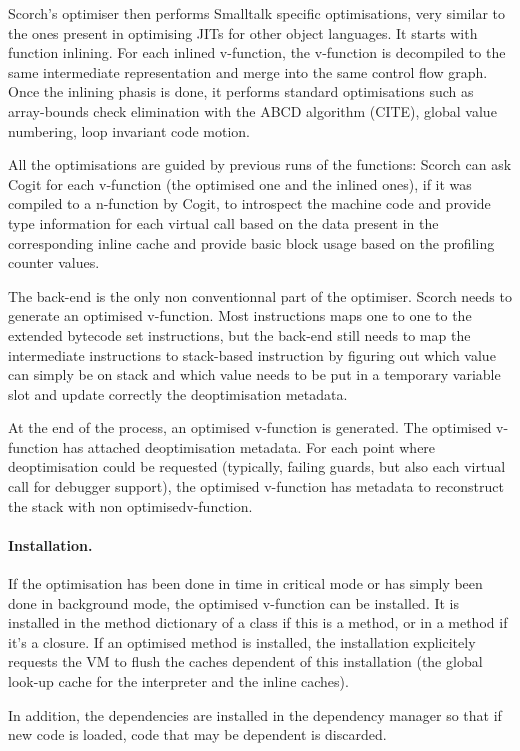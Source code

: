 \documentclass[a4paper,12pt,twoside]{../includes/ThesisStyle}
\begin{document}
Scorch's optimiser then performs Smalltalk specific optimisations, very similar to the ones present in optimising JITs for other object languages. It starts with function inlining. For each inlined v-function, the v-function is decompiled to the same intermediate representation and merge into the same control flow graph. Once the inlining phasis is done, it performs standard optimisations such as array-bounds check elimination with the ABCD algorithm (CITE), global value numbering, loop invariant code motion.

All the optimisations are guided by previous runs of the functions: Scorch can ask Cogit for each v-function (the optimised one and the inlined ones), if it was compiled to a n-function by Cogit, to introspect the machine code and provide type information for each virtual call based on the data present in the corresponding inline cache and provide basic block usage based on the profiling counter values.

The back-end is the only non conventionnal part of the optimiser. Scorch needs to generate an optimised v-function. Most instructions maps one to one to the extended bytecode set instructions, but the back-end still needs to map the intermediate instructions to stack-based instruction by figuring out which value can simply be on stack and which value needs to be put in a temporary variable slot and update correctly the deoptimisation metadata.

At the end of the process, an optimised v-function is generated. The optimised v-function has attached deoptimisation metadata. For each point where deoptimisation could be requested (typically, failing guards, but also each virtual call for debugger support), the optimised v-function has metadata to reconstruct the stack with non optimisedv-function.

\paragraph{Installation.}
If the optimisation has been done in time in critical mode or has simply been done in background mode, the optimised v-function can be installed. It is installed in the method dictionary of a class if this is a method, or in a method if it's a closure. If an optimised method is installed, the installation explicitely requests the VM to flush the caches dependent of this installation (the global look-up cache for the interpreter and the inline caches).

In addition, the dependencies are installed in the dependency manager so that if new code is loaded, code that may be dependent is discarded.
\end{document}
